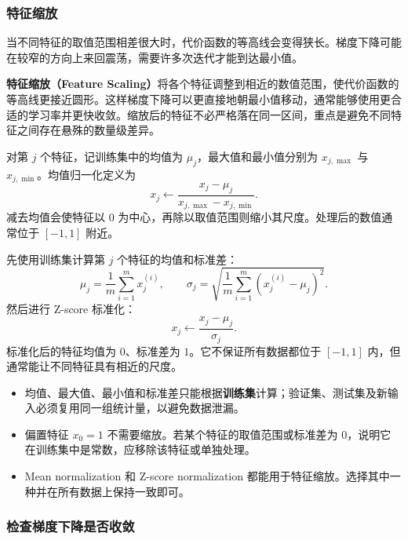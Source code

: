 \documentclass[12pt,a4paper]{ctexart}
\newcommand{\important}[1]{\textbf{\textcolor{MainColor}{#1}}}
\newcommand{\concept}[1]{\textbf{\textcolor{DefineColor}{#1}}}
\begin{document}
\subsubsection{特征缩放}

\begin{keybox}[为什么需要特征缩放]
当不同特征的取值范围相差很大时，代价函数的等高线会变得狭长。梯度下降可能在较窄的方向上来回震荡，需要许多次迭代才能到达最小值。

\concept{特征缩放（Feature Scaling）}将各个特征调整到相近的数值范围，使代价函数的等高线更接近圆形。这样梯度下降可以更直接地朝最小值移动，通常能够使用更合适的学习率并更快收敛。缩放后的特征不必严格落在同一区间，重点是避免不同特征之间存在悬殊的数量级差异。
\end{keybox}

\begin{definitionbox}
对第 $j$ 个特征，记训练集中的均值为 $\mu_j$，最大值和最小值分别为 $x_{j,\max}$ 与 $x_{j,\min}$。均值归一化定义为
\[
  x_j \leftarrow
  \frac{x_j-\mu_j}{x_{j,\max}-x_{j,\min}}.
\]
减去均值会使特征以 $0$ 为中心，再除以取值范围则缩小其尺度。处理后的数值通常位于 $[-1,1]$ 附近。
\end{definitionbox}

\begin{definitionbox}
先使用训练集计算第 $j$ 个特征的均值和标准差：
\[
  \mu_j=\frac{1}{m}\sum_{i=1}^{m}x_j^{(i)},
  \qquad
  \sigma_j=\sqrt{\frac{1}{m}\sum_{i=1}^{m}
  \left(x_j^{(i)}-\mu_j\right)^2}.
\]
然后进行 Z-score 标准化：
\[
  x_j \leftarrow \frac{x_j-\mu_j}{\sigma_j}.
\]
标准化后的特征均值为 $0$、标准差为 $1$。它不保证所有数据都位于 $[-1,1]$ 内，但通常能让不同特征具有相近的尺度。
\end{definitionbox}

\begin{tipbox}[使用特征缩放时的注意事项]
\begin{itemize}
  \item 均值、最大值、最小值和标准差只能根据\important{训练集}计算；验证集、测试集及新输入必须复用同一组统计量，以避免数据泄漏。
  \item 偏置特征 $x_0=1$ 不需要缩放。若某个特征的取值范围或标准差为 $0$，说明它在训练集中是常数，应移除该特征或单独处理。
  \item Mean normalization 和 Z-score normalization 都能用于特征缩放。选择其中一种并在所有数据上保持一致即可。
\end{itemize}
\end{tipbox}
\subsubsection{检查梯度下降是否收敛}
\end{document}

